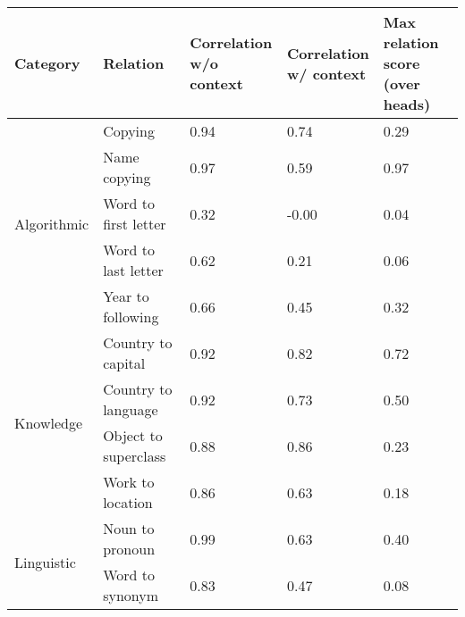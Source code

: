 \begin{tabular}{lllll}
\toprule
Category & Relation & \makecell{Correlation\\w/o context} & \makecell{Correlation\\w/ context} & \makecell{Max relation score\\(over heads)} \\
\midrule
\multirow{5}{*}{Algorithmic} & Copying & 0.94 & 0.74 & 0.29 \\
 & Name copying & 0.97 & 0.59 & 0.97 \\
 & Word to first letter & 0.32 & -0.00 & 0.04 \\
 & Word to last letter & 0.62 & 0.21 & 0.06 \\
 & Year to following & 0.66 & 0.45 & 0.32 \\
\multirow{4}{*}{Knowledge} & Country to capital & 0.92 & 0.82 & 0.72 \\
 & Country to language & 0.92 & 0.73 & 0.50 \\
 & Object to superclass & 0.88 & 0.86 & 0.23 \\
 & Work to location & 0.86 & 0.63 & 0.18 \\
\multirow{2}{*}{Linguistic} & Noun to pronoun & 0.99 & 0.63 & 0.40 \\
 & Word to synonym & 0.83 & 0.47 & 0.08 \\
\bottomrule
\end{tabular}
